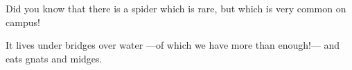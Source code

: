 \documentclass[12pt]{UoYmemo}
\date{31 February 1994}
\begin{document}
Did you know that there is a spider which is rare, but which is very
common on campus!

It lives under bridges over water ---of which we have more than
enough!--- and eats gnats and midges.
\end{document}
